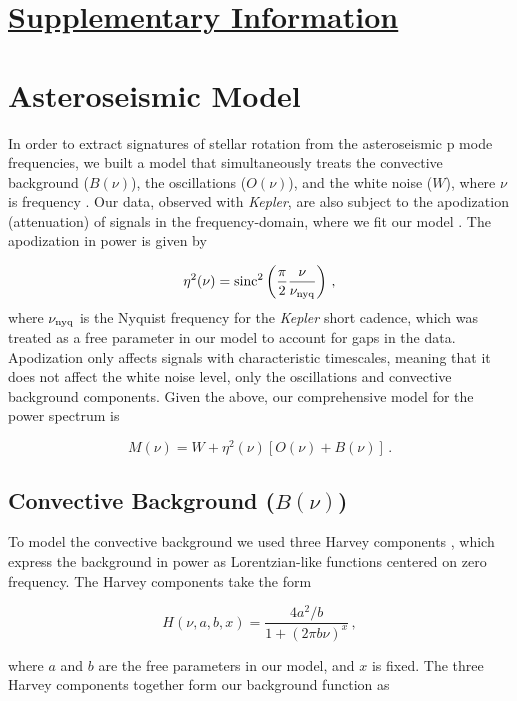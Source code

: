 \documentclass[12pt]{article}
\newcommand{\kepler}{\emph{Kepler}\xspace}
\begin{document}
\section*{\underline{Supplementary Information}}
\tableofcontents

\section{Asteroseismic Model}\label{s:seismo}
In order to extract signatures of stellar rotation from the asteroseismic p mode frequencies, we built a model that simultaneously treats the convective background ($B(\nu)$), the oscillations ($O(\nu)$), and the white noise ($W$), where $\nu$ is frequency \cite{davies+2015}. Our data, observed with \kepler, are also subject to the apodization (attenuation) of signals in the frequency-domain, where we fit our model \cite{chaplin+2011}. The apodization in power is given by

\begin{equation}\label{eq:apodization}
	\eta^2(\nu) = \rm{sinc}^2\left(\frac{\pi}{2}\frac{\nu}{\nu_{\rm nyq}}\right)\, ,
\end{equation}
where $\nu_{\rm nyq}$ is the Nyquist frequency for the \kepler short cadence, which was treated as a free parameter in our model to account for gaps in the data. Apodization only affects signals with characteristic timescales, meaning that it does not affect the white noise level, only the oscillations and convective background components. Given the above, our comprehensive model for the power spectrum is

\begin{equation}\label{eq:model}
	M(\nu) = W + \eta^2(\nu)[O(\nu) + B(\nu)]\, .
\end{equation}

\subsection{Convective Background ($B(\nu)$)}
To model the convective background we used three Harvey components \cite{harvey1985}, which express the background in power as Lorentzian-like functions centered on zero frequency. The Harvey components take the form 

\begin{equation}
	H(\nu, a, b, x) = \frac{4a^2/b}{1 + (2\pi b\nu)^x}\, ,
\end{equation}

\noindent where $a$ and $b$ are the free parameters in our model, and $x$ is fixed. The three Harvey components together form our background function as
\end{document}
